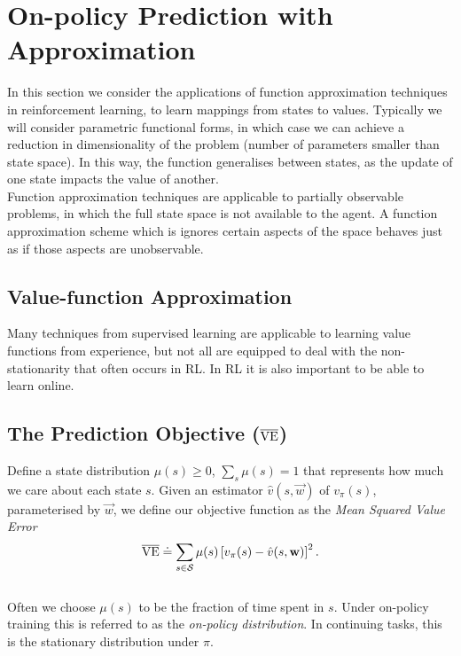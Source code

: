 \section{On-policy Prediction with Approximation}

In this section we consider the applications of function approximation techniques in reinforcement learning, to learn mappings from states to values. Typically we will consider parametric functional forms, in which case we can achieve a reduction in dimensionality of the problem (number of parameters smaller than state space). In this way, the function generalises between states, as the update of one state impacts the value of another.\\

Function approximation techniques are applicable to partially observable problems, in which the full state space is not available to the agent. A function approximation scheme which is ignores certain aspects of the space behaves just as if those aspects are unobservable.

\subsection{Value-function Approximation}
Many techniques from supervised learning are applicable to learning value functions from experience, but not all are equipped to deal with the non-stationarity that often occurs in RL. In RL it is also important to be able to learn online.\\

\subsection{The Prediction Objective ($\overline{\mathrm{VE}}{}$)}
Define a state distribution $\mu(s) \geq 0$, $\sum_s \mu(s) = 1$ that represents how much we care about each state $s$. Given an estimator $\hat{v}(s, \vec{w})$ of $v_\pi(s)$, parameterised by $\vec{w}$, we define our objective function as the \emph{Mean Squared Value Error}
\begin{equation}
    \overline{\mathrm{VE}}{} \doteq \sum_{s \in \mathcal{S}{}} \mu(s) \left[ v_\pi(s) - \hat{v}(s, \mathbf{w})\right]^2.
\end{equation}\\

Often we choose $\mu(s)$ to be the fraction of time spent in $s$. Under on-policy training this is referred to as the \emph{on-policy distribution}. In continuing tasks, this is the stationary distribution under $\pi$.\\

